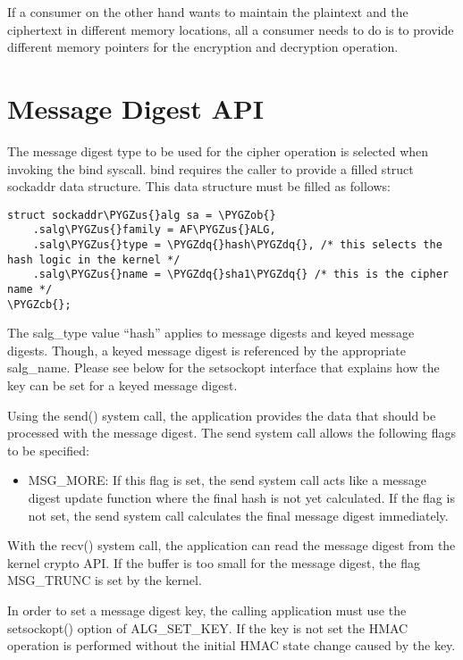 \documentclass[a4paper,8pt,english]{sphinxmanual}
\def\PYGZus{\char`\_}
\def\PYGZob{\char`\{}
\def\PYGZcb{\char`\}}
\def\PYGZdq{\char`\"}
\begin{document}
If a consumer on the other hand wants to maintain the plaintext and the
ciphertext in different memory locations, all a consumer needs to do is
to provide different memory pointers for the encryption and decryption
operation.


\section{Message Digest API}
\label{crypto/userspace-if:message-digest-api}
The message digest type to be used for the cipher operation is selected
when invoking the bind syscall. bind requires the caller to provide a
filled struct sockaddr data structure. This data structure must be
filled as follows:

\begin{Verbatim}[commandchars=\\\{\}]
struct sockaddr\PYGZus{}alg sa = \PYGZob{}
    .salg\PYGZus{}family = AF\PYGZus{}ALG,
    .salg\PYGZus{}type = \PYGZdq{}hash\PYGZdq{}, /* this selects the hash logic in the kernel */
    .salg\PYGZus{}name = \PYGZdq{}sha1\PYGZdq{} /* this is the cipher name */
\PYGZcb{};
\end{Verbatim}

The salg\_type value ``hash'' applies to message digests and keyed message
digests. Though, a keyed message digest is referenced by the appropriate
salg\_name. Please see below for the setsockopt interface that explains
how the key can be set for a keyed message digest.

Using the send() system call, the application provides the data that
should be processed with the message digest. The send system call allows
the following flags to be specified:
\begin{itemize}
\item {} 
MSG\_MORE: If this flag is set, the send system call acts like a
message digest update function where the final hash is not yet
calculated. If the flag is not set, the send system call calculates
the final message digest immediately.

\end{itemize}

With the recv() system call, the application can read the message digest
from the kernel crypto API. If the buffer is too small for the message
digest, the flag MSG\_TRUNC is set by the kernel.

In order to set a message digest key, the calling application must use
the setsockopt() option of ALG\_SET\_KEY. If the key is not set the HMAC
operation is performed without the initial HMAC state change caused by
the key.
\end{document}

